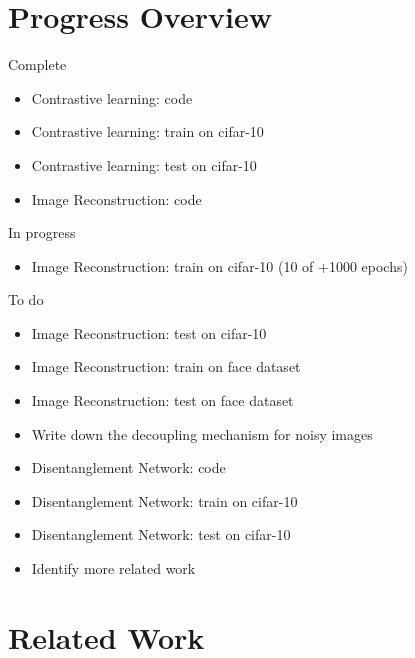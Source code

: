\documentclass[11pt]{article}
\begin{document}
\section{Progress Overview}

Complete

\begin{itemize}
\item Contrastive learning: code
\item Contrastive learning: train on cifar-10
\item Contrastive learning: test on cifar-10
\item Image Reconstruction: code
\end{itemize}

In progress

\begin{itemize}
\item Image Reconstruction: train on cifar-10  (10 of +1000 epochs)
\end{itemize}


To do

\begin{itemize}
\item Image Reconstruction: test on cifar-10
\item Image Reconstruction: train on face dataset
\item Image Reconstruction: test on face dataset
\item Write down the decoupling mechanism for noisy images
\item Disentanglement Network: code
\item Disentanglement Network: train on cifar-10
\item Disentanglement Network: test on cifar-10
\item Identify more related work
\end{itemize}


\newpage
\section*{Related Work}


\newpage



\end{document}
